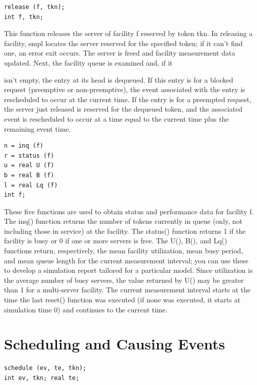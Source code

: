 \begin{verbatim}
release (f, tkn);
int f, tkn;
\end{verbatim}

This function releases the server of facility f reserved by token tkn. In
releasing a facility, smpl locates the server reserved for the specified token;
if it can't find one, an error exit occurs. The server is freed and facility
measurement data updated. Next, the facility queue is examined and, if it

\noindent isn't empty, the entry at its head is dequeued. If this entry is for a blocked
request (preemptive or non-preemptive), the event associated with the entry is
rescheduled to occur at the current time. If the entry is for a preempted
request, the server just released is reserved for the dequeued token, and the
associated event is rescheduled to occur at a time equal to the current time
plus the remaining event time.

\begin{verbatim}
n = inq (f)
r = status (f)
u = real U (f)
b = real B (f)
l = real Lq (f)
int f;
\end{verbatim}

These five functions are used to obtain status and performance data for
facility f. The inq() function returns the number of tokens currently in queue
(only, not including those in service) at the facility. The status() function
returns 1 if the facility is busy or 0 if one or more servers is free. The U(),
B(), and Lq() functions return, respectively, the mean facility utilization,
mean busy period, and mean queue length for the current measurement interval;
you can use these to develop a simulation report tailored for a particular
model. Since utilization is the average number of busy servers, the value
returned by U() may be greater than 1 for a multi-server facility. The current
measurement interval starts at the time the last reset() function was executed
(if none was executed, it starts at simulation time 0) and continues to the
current time.

\section{Scheduling and Causing Events}
\label{sec:smpl-scheduling-causing-events}

\begin{verbatim}
schedule (ev, te, tkn);
int ev, tkn; real te;
\end{verbatim}

